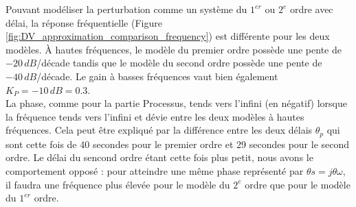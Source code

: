 Pouvant modéliser la perturbation comme un système du $1^{er}$ ou $2^{e}$ ordre avec délai, la réponse fréquentielle (Figure \ref{fig:DV_approximation_comparison_frequency}) est différente pour les deux modèles.
À hautes fréquences, le modèle du premier ordre possède une pente de $-20\,dB$/décade tandis que le modèle du second ordre possède une pente de $-40\,dB$/décade.
Le gain à basses fréquences vaut bien également $K_P = -10\,dB = 0.3$.\\
La phase, comme pour la partie Processus, tends vers l'infini (en négatif) lorsque la fréquence tends vers l'infini et dévie entre les deux modèles à hautes fréquences.
Cela peut être expliqué par la différence entre les deux délais $\theta_p$ qui sont cette fois de 40 secondes pour le premier ordre et 29 secondes pour le second ordre.
Le délai du sencond ordre étant cette fois plus petit, nous avons le comportement opposé : pour atteindre une même phase représenté par $\theta s = j\theta\omega$, il faudra une fréquence plus élevée pour le modèle du $2^{e}$ ordre que pour le modèle du $1^{er}$ ordre. 